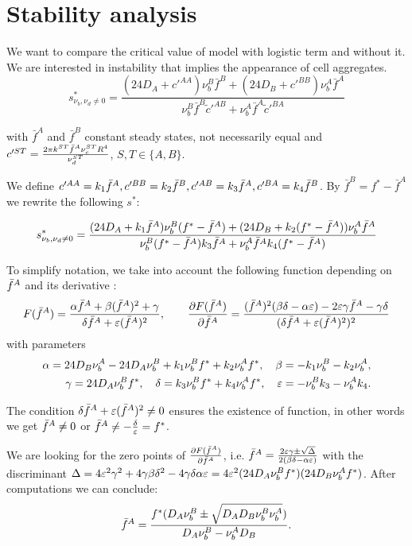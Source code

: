 \section{Stability analysis}

We want to compare the critical value of model with logistic term and without it. We are interested in instability  that implies the appearance of cell aggregates.
\begin{equation}
s^{*}_{\nu_b,\nu_d \ne 0}=\frac{(24 D_A+c'^{AA})\nu_{b}^{B}\bar{f}^{B}+(24 D_B+c'^{BB})\nu_{b}^{A}\bar{f}^A}{\nu_{b}^{B}\bar{f}^B\tilde{c}'^{AB}+\nu_{b}^{A}\bar{f}^A\tilde{c}'^{BA}}
\end{equation}

with $\bar{f}^A$ and $\bar{f}^B$ constant steady states, not necessarily equal and 
$c'^{ST}=\frac{2\pi k^{ST} {\bar{f}^A} \nu_c^{ST} R^{4}}{\nu_d^{ST}}$, $S,T \in \{ A,B \}$.

We define $c'^{AA}=k_1 {\bar{f}^A}, c'^{BB}=k_2{\bar{f}^B}, c'^{AB}=k_3{\bar{f}^A}, c'^{BA}=k_4{\bar{f}^B}$.
By $\bar{f}^B=f^*-\bar{f}^A$ we rewrite the following $s^*$:

\begin{equation}
s^{*}_{\nu_b,\nu_d \ne 0}=\frac{(24 D_A+k_1{\bar{f}^A})\nu_{b}^{B}(f^*-{\bar{f}^A})+(24 D_B+k_2(f^*-{\bar{f}^A}))\nu_{b}^{A}\bar{f}^A}{\nu_{b}^{B}(f^*-{\bar{f}^A})k_3{\bar{f}^A}+\nu_{b}^{A}\bar{f}^Ak_4(f^*-{\bar{f}^A})}
\end{equation}

To simplify notation, we take into account the following function depending on ${\bar{f}^A}$ and its derivative :
$$F({\bar{f}^A})=\frac{{\alpha} {\bar{f}^A} + {\beta} ({\bar{f}^A})^2 + {\gamma}}{{\delta} {\bar{f}^A} + \varepsilon({\bar{f}^A})^2}, \quad\quad 
\frac{{\partial} F({\bar{f}^A})}{{\partial} {\bar{f}^A}}=\frac{({\bar{f}^A})^2({\beta} {\delta}-{\alpha} \varepsilon)-2\varepsilon {\gamma} {\bar{f}^A} - {\gamma}{\delta}}{({\delta} {\bar{f}^A}+\varepsilon ({\bar{f}^A})^2)^2}$$ 
with parameters 
\begin{align}
{\alpha}= 24D_B \nu_b^A -24 D_A \nu_b^B +k_1 \nu_b^B f^* + k_2 \nu_b^A f^*, \quad
{\beta}=-k_1 \nu_b^B -k_2 \nu_b^A, \\
{\gamma}= 24 D_A \nu_b^B f^*, \quad 
{\delta}= k_3\nu_b^B f^*+k_4 \nu_b^A f^*, \quad
\varepsilon= -\nu_b^B k_3-	\nu_b^A k_4.
\end{align}

\begin{remark}
	The condition ${\delta} {\bar{f}^A} + \varepsilon ({\bar{f}^A})^2 \ne 0 $ ensures the existence of function, in other words we get  ${\bar{f}^A} \ne 0 $ or ${\bar{f}^A} \ne -\frac{{\delta}}{\varepsilon}=f^*$. 
\end{remark}

We are looking for the zero points of $\frac{{\partial} F({\bar{f}^A})}{{\partial} {\bar{f}^A}}$, i.e. 
$ {\bar{f}^A}=\frac{2 \varepsilon {\gamma} \pm \sqrt{\Delta}}{2({\beta} {\delta} - {\alpha} \varepsilon )} $ with the discriminant
$\Delta=4\varepsilon^2 {\gamma}^2 + 4 {\gamma} {\beta} {\delta}^2 -4 {\gamma} {\delta} {\alpha} \varepsilon = 4\varepsilon^2(24D_A \nu_b^B f^*)(24 D_B \nu_b^A f^*)$. After computations we can conclude:
\begin{equation}
{\bar{f}^A}=\frac{f^*(D_A \nu_b^B \pm \sqrt{D_A D_B \nu_b^B \nu_b^A})}{D_A \nu_b^B -\nu_b^A D_B}.
\end{equation}




